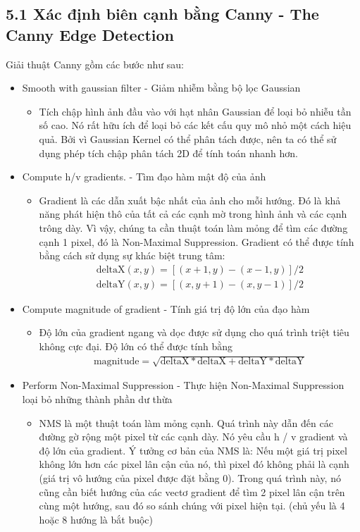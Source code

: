 \documentclass{article}
\begin{document}
	\subsection{5.1 Xác định biên cạnh bằng Canny - The Canny Edge Detection}
	Giải thuật Canny gồm các bước như sau:
	\begin{itemize}
		\item Smooth with gaussian filter - Giảm nhiễm bằng bộ lọc Gaussian
		\begin{itemize}
			\item Tích chập hình ảnh đầu vào với hạt nhân Gaussian để loại bỏ nhiễu tần số cao. Nó rất hữu ích để loại bỏ các kết cấu quy mô nhỏ một cách hiệu quả. Bởi vì Gaussian Kernel có thể phân tách được, nên ta có thể sử dụng phép tích chập phân tách 2D để tính toán nhanh hơn.
		\end{itemize}
		\item Compute h/v gradients. - Tìm đạo hàm mật độ của ảnh
		\begin{itemize}
			\item Gradient là các dẫn xuất bậc nhất của ảnh cho mỗi hướng. Đó là khả năng phát hiện thô của tất cả các cạnh mờ trong hình ảnh và các cạnh trông dày. Vì vậy, chúng ta cần thuật toán làm mỏng để tìm các đường cạnh 1 pixel, đó là Non-Maximal Suppression. Gradient có thể được tính bằng cách sử dụng sự khác biệt trung tâm:
			\begin{align*}
				\text{deltaX}(x,y) = [(x+1, y) - (x-1, y)] / 2 \\
				\text{deltaY}(x,y) = [(x, y+1) - (x, y-1)] / 2
			\end{align*}
		\end{itemize}
		\item Compute magnitude of gradient - Tính giá trị độ lớn của đạo hàm
		\begin{itemize}
			\item Độ lớn của gradient ngang và dọc được sử dụng cho quá trình triệt tiêu không cực đại. Độ lớn có thể được tính bằng
			\begin{align*}
				\text{magnitude} = \sqrt{\text{deltaX}*\text{deltaX} + \text{deltaY}*\text{deltaY}}
			\end{align*}
		\end{itemize}
		\item Perform Non-Maximal Suppression - Thực hiện Non-Maximal Suppression loại bỏ những thành phần dư thừa
		\begin{itemize}
			\item NMS là một thuật toán làm mỏng cạnh. Quá trình này dẫn đến các đường gờ rộng một pixel từ các cạnh dày. Nó yêu cầu h / v gradient và độ lớn của gradient. Ý tưởng cơ bản của NMS là: Nếu một giá trị pixel không lớn hơn các pixel lân cận của nó, thì pixel đó không phải là cạnh (giá trị vô hướng của pixel được đặt bằng 0). Trong quá trình này, nó cũng cần biết hướng của các vectơ gradient để tìm 2 pixel lân cận trên cùng một hướng, sau đó so sánh chúng với pixel hiện tại. (chủ yếu là 4 hoặc 8 hướng là bắt buộc)

\end{itemize}
\end{itemize}
\end{document}
